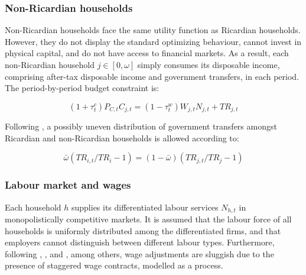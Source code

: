 \documentclass[a4paper,11pt]{article}
\numberwithin{equation}{section}
\begin{document}
	
	\subsubsection{Non-Ricardian households}
	
	Non-Ricardian households face the same utility function as Ricardian households. However, they do not display the standard optimizing behaviour, cannot invest in physical capital, and do not have access to financial markets. As a result, each non-Ricardian household $j\in\left[0,\omega\right]$ simply consumes its disposable income, comprising after-tax disposable income and government transfers, in each period. The period-by-period budget constraint is:
	
	\begin{equation} \label{nr_budget}
	\left(1+\tau_t^c\right)P_{C,t}C_{j,t}=\left(1-\tau_t^w\right)W_{j,t}N_{j,t}+TR_{j,t}
	\end{equation}
	
	Following \cite{coenen2013}, a possibly uneven distribution of government transfers amongst Ricardian and non-Ricardian households is allowed according to:
	
	\begin{equation*}
	\bar{\omega}\left(TR_{i,t}/TR_i-1\right)=\left(1-\bar{\omega}\right)\left(TR_{j,t}/TR_j-1\right)
	\end{equation*} 
	
	
	\subsubsection{Labour market and wages} \label{labour}
	
	Each household $h$ supplies its differentiated labour services $N_{h,t}$ in monopolistically competitive markets. It is assumed that the labour force of all households is uniformly distributed among the differentiated firms, and that employers cannot distinguish between different labour types. Furthermore, following \cite{adolfson2007}, \cite{christoffel2008}, and \cite{coenen2013}, among others, wage adjustments are sluggish due to the presence of staggered wage contracts, modelled as a  \cite{calvo1983} process. 
	
\end{document}
